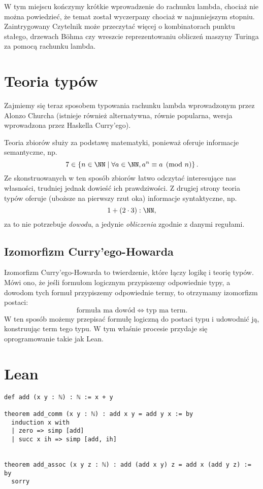 \documentclass[polish,pretty]{angav}
\begin{document}
W tym miejscu kończymy krótkie wprowadzenie do rachunku lambda, chociaż nie można powiedzieć, że temat został wyczerpany chociaż w najmniejszym stopniu. Zaintrygowany Czytelnik może przeczytać więcej o kombinatorach punktu stałego, drzewach Böhma czy wreszcie reprezentowaniu obliczeń maszyny Turinga za pomocą rachunku lambda.

\section{Teoria typów}

Zajmiemy się teraz sposobem typowania rachunku lambda wprowadzonym przez Alonzo Churcha (istnieje również alternatywna, równie popularna, wersja wprowadzona przez Haskella Curry'ego).



Teoria zbiorów służy za podstawę matematyki, ponieważ oferuje informacje semantyczne, np.
\[ 7 \in \left\{n \in \NN \mid \forall a \in \NN, a^n \equiv a \pmod{n} \right\}. \]
Ze skonstruowanych w ten sposób zbiorów łatwo odczytać interesujące nas własności, trudniej jednak dowieść ich prawdziwości.
Z drugiej strony teoria typów oferuje (uboższe na pierwszy rzut oka) informacje syntaktyczne, np.
\[ 1 + (2 \cdot 3) : \NN, \]
za to nie potrzebuje \emph{dowodu}, a jedynie \emph{obliczenia} zgodnie z danymi regułami.

\subsection{Izomorfizm Curry'ego-Howarda}

Izomorfizm Curry'ego-Howarda to twierdzenie, które łączy logikę i teorię typów.
Mówi ono, że jeśli formułom logicznym przypiszemy odpowiednie typy, a dowodom tych formuł przypiszemy odpowiednie termy, to otrzymamy izomorfizm postaci:
\[ \text{formuła ma dowód} \iff \text{typ ma term}. \]
W ten sposób możemy przepisać formułę logiczną do postaci typu i udowodnić ją, konstruując term tego typu.
W tym właśnie procesie przydaje się oprogramowanie takie jak Lean.

\section{Lean}

\begin{verbatim}
def add (x y : ℕ) : ℕ := x + y

theorem add_comm (x y : ℕ) : add x y = add y x := by
  induction x with
  | zero => simp [add]
  | succ x ih => simp [add, ih]


theorem add_assoc (x y z : ℕ) : add (add x y) z = add x (add y z) := by
  sorry
\end{verbatim}
\end{document}
